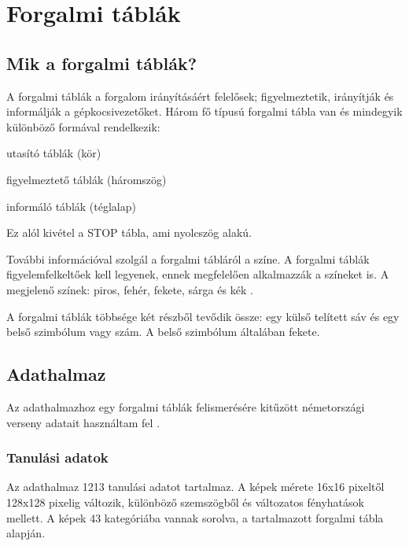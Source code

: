 \chapter{Forgalmi táblák}\label{ch:SIGNS}

\section{Mik a forgalmi táblák?}\label{sec:SIGNS:whatAreThey}

A forgalmi táblák a forgalom irányításáért felelősek; figyelmeztetik, irányítják és informálják a gépkocsivezetőket. Három fő típusú forgalmi tábla van és mindegyik különböző formával rendelkezik:
\begin{compactenum}
	\item utasító táblák (kör)
	\item figyelmeztető táblák (háromszög)
	\item informáló táblák (téglalap)
\end{compactenum}

Ez alól kivétel a STOP tábla, ami nyolcszög alakú.

További információval szolgál a forgalmi tábláról a színe. A forgalmi táblák figyelemfelkeltőek kell legyenek, ennek megfelelően alkalmazzák a színeket is. A megjelenő színek: piros, fehér, fekete, sárga és kék \cite{8}.

A forgalmi táblák többsége két részből tevődik össze: egy külső telített sáv és egy belső szimbólum vagy szám. A belső szimbólum általában fekete. 


\section{Adathalmaz}\label{sec:SIGNS:dataSet}

Az adathalmazhoz egy forgalmi táblák felismerésére kitűzött németországi verseny adatait használtam fel \cite{9}.

\subsection{Tanulási adatok}

Az adathalmaz 1213 tanulási adatot tartalmaz. A képek mérete 16x16 pixeltől 128x128 pixelig változik, különböző szemszögből és változatos fényhatások mellett. A képek 43 kategóriába vannak sorolva, a tartalmazott forgalmi tábla alapján.

